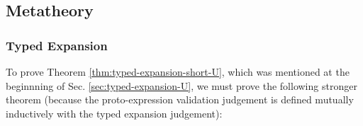 




\subsection{Metatheory}\label{sec:SE-metatheory}
\subsubsection{Typed Expansion}
To prove Theorem \ref{thm:typed-expansion-short-U}, which was mentioned at the beginnning of Sec. \ref{sec:typed-expansion-U}, we must  prove the following stronger theorem (because the proto-expression validation judgement is defined mutually inductively with the typed expansion judgement):

